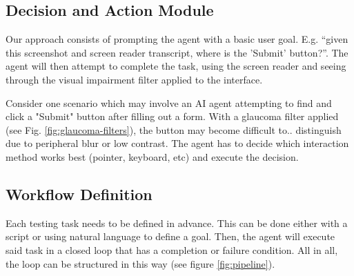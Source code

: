 \subsection{Decision and Action Module}

Our approach consists of prompting the agent with a basic user goal. E.g. “given this screenshot and screen reader transcript, where is the 'Submit' button?”. The agent will then attempt to complete the task, using the screen reader and seeing through the visual impairment filter applied to the interface.

Consider one scenario which may involve an \ac{AI} agent attempting to find and click a "Submit" button after filling out a form. With a glaucoma filter applied (see Fig. \ref{fig:glaucoma-filters}), the button may become difficult to.. distinguish due to peripheral blur or low contrast. The agent has to decide which interaction method works best (pointer, keyboard, etc) and execute the decision.



\subsection{Workflow Definition}

Each testing task needs to be defined in advance. This can be done either with a script or using natural language to define a goal. Then, the agent will execute said task in a closed loop that has a completion or failure condition. All in all, the loop can be structured in this way (see figure \ref{fig:pipeline}).


